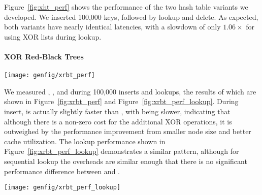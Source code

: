 Figure~\ref{fig:xht_perf} shows the performance of the two hash table variants
we developed. We inserted 100,000 keys, followed by lookup and delete.
As expected, both variants have nearly identical latencies, with a slowdown of
only $1.06\times$ for using XOR lists during lookup.




\paragraph{XOR Red-Black Trees}








\begin{SCfigure}
	\centering
	\texttt{[image: genfig/xrbt\_perf]}
	\caption[XOR red-black tree insert latency]{Insert latency for XOR red-black trees compared to normal
		red-black trees. The label ``a'' shows the cost of the XORs, while ``b''
		shows the cost of the larger node.}
	\label{fig:xrbt_perf}
\end{SCfigure}



We measured \xrbt, \xrbtbig, and \rbt during 100,000 inserts and lookups, the results of
which are shown in Figure~\ref{fig:xrbt_perf} and
Figure~\ref{fig:xrbt_perf_lookup}. During insert, \xrbt is actually slightly
faster than \rbt, with \xrbtbig being slower, indicating that although there is
a non-zero cost for the additional XOR operations, it is outweighed by the
performance improvement from smaller node size and better cache utilization. The
lookup performance shown in Figure~\ref{fig:xrbt_perf_lookup} demonstrates a
similar pattern, although for sequential lookup the overheads are similar enough
that there is no significant performance difference between \xrbt and \rbt.

\begin{SCfigure}
	\centering
	\texttt{[image: genfig/xrbt\_perf\_lookup]}
	\caption[XOR red-black tree lookup latency]{Lookup latency for XOR red-black trees compared to normal
		red-black trees.}
	\label{fig:xrbt_perf_lookup}
\end{SCfigure}

